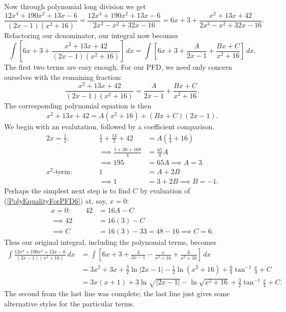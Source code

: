 Now through polynomial long division we get
\begin{equation}
\frac{12x^4+190x^2+13x-6}{(2x-1)(x^2+16)}
 =\frac{12x^4+190x^2+13x-6}{2x^3-x^2+32x-16}
 =6x+3+\frac{x^2+13x+42}{2x^3-x^2+32x-16}.\end{equation}
Refactoring our denominator, our integral now becomes
$$\int\left[6x+3+\frac{x^2+13x+42}{(2x-1)(x^2+16)}\right]\,dx
=\int\left[6x+3+\frac{A}{2x-1}+\frac{Bx+C}{x^2+16}\right]\,dx.$$
The first two terms are easy enough.  For our PFD, we need only
concern ourselves with the remaining fraction:
$$\frac{x^2+13x+42}{(2x-1)(x^2+16)}=
\frac{A}{2x-1}+\frac{Bx+C}{x^2+16}.$$
The corresponding polynomial equation is then
\begin{equation}
x^2+13x+42=A(x^2+16)+(Bx+C)(2x-1).
\label{PolyEqualityForPFD6}\end{equation}
We begin with an evalutation, followed by a coefficient comparison.
\begin{alignat*}{2}
\underline{x=\frac12}:&\qquad&\frac14+\frac{13}2+42&=
              A\left(\frac14+16\right)\\
       &&\implies \frac{1+26+168}{4}&=\frac{65}4A\\
       &&\implies {195}&=65A\implies\boxed{A=3}\\
\underline{x^2\text{-term}}:
           &&1&=A+2B\\
           &&\implies1&=3+2B\implies\boxed{B=-1}.
\end{alignat*}
Perhaps the simplest next step is to find $C$ by evaluation of
(\ref{PolyEqualityForPFD6}) at,
say, $x=0$:
\begin{align*}
\underline{x=0}:\qquad 42&=16A-C\\
                  \implies42&=16(3)-C\\
                  \implies C&=16(3)-33=48-16\implies \boxed{C=6}.
\end{align*}
Thus our original integral, including the polynomial terms, becomes
\begin{align*}
\int\frac{12x^4+190x^2+13x-6}{(2x-1)(x^2+16)}\,dx
&=\int\left[6x+3+\frac{3}{2x-1}-\frac{x}{x^2+16}+\frac{6}{x^2+16}
  \right]\,dx\\
&=3x^2+3x+\frac32\ln|2x-1|-\frac12\ln(x^2+16)+\frac64\tan^{-1}\frac{x}4
+C\\&=3x(x+1)+3\ln\sqrt{|2x-1|}-
\ln\sqrt{x^2+16}+\frac32\tan^{-1}\frac{x}4
+C.\end{align*}
The second from the last line was complete; the last line just gives
some alternative styles for the particular terms.
\eex


